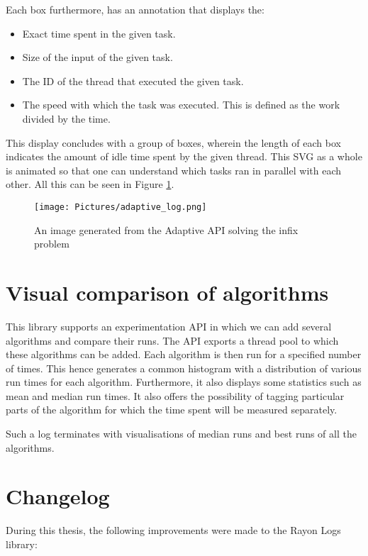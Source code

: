 Each box furthermore, has an annotation that displays the:
\begin{itemize}
\item Exact time spent in the given task.
\item Size of the input of the given task.
\item The ID of the thread that executed the given task.
\item The speed with which the task was executed. This is defined as the work divided by the time.
\end{itemize}

This display concludes with a group of boxes, wherein the length of each box indicates the amount of idle time spent by the given thread. This SVG as a whole is animated so that one can understand which tasks ran in parallel with each other. All this can be seen in Figure \ref{fig:adaptive_log}.
\begin{figure}%
    \texttt{[image: Pictures/adaptive\_log.png]}
    \caption[Optimization]{An image generated from the Adaptive API solving the infix problem}
	\label{fig:adaptive_log}
\end{figure}

\section{Visual comparison of algorithms}
This library supports an experimentation API in which we can add several algorithms and compare their runs.
The API exports a thread pool to which these algorithms can be added.
Each algorithm is then run for a specified number of times.
This hence generates a common histogram with a distribution of various run times for each algorithm.
Furthermore, it also displays some statistics such as mean and median run times.
It also offers the possibility of tagging particular parts of the algorithm for which the time spent will be measured separately.

Such a log terminates with visualisations of median runs and best runs of all the algorithms.
\clearpage
\section{Changelog}
During this thesis, the following improvements were made to the Rayon Logs library:

